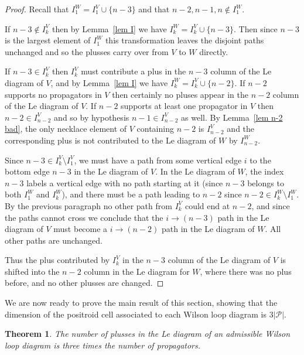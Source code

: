 \documentclass[11pt]{article}
\newcommand{\cP}{\mathcal{P}}
\newtheorem{thm}{Theorem}[section]
\theoremstyle{remark}
\theoremstyle{definition}
\begin{document}
\begin{proof}
Recall that $I_1^W = I_1^V\cup \{n-3\}$ and that $n-2,n-1,n \not\in I_1^W$.

  If $n-3\not\in I_{k}^{V}$ then by Lemma~\ref{lem I} we have $I_{k}^{W} = I_k^{V}\cup \{n-3\}$.  Then since $n-3$ is the largest element of $I_1^{W}$ this transformation leaves the disjoint paths unchanged and so the plusses carry over from $V$ to $W$ directly.

  If $n-3\in I_{k}^{V}$ then $I_k^V$ must contribute a plus in the $n-3$ column of the Le diagram of $V$, and by Lemma~\ref{lem I} we have $I_{k}^{W} = I_k^{V}\cup \{n-2\}$. If $n-2$ supports no propagators in $V$ then certainly no pluses appear in the $n-2$ column of the Le diagram of $V$. If $n-2$ supports at least one propagator in $V$ then $n-2 \in I_{n-2}^V$ and so by hypothesis $n-1 \in I_{n-2}^V$ as well. By Lemma~\ref{lem n-2 bad}, the only necklace element of $V$ containing $n-2$ is $I_{n-2}^{V}$ and the corresponding plus is not contributed to the Le diagram of $W$ by $I_{n-2}^{W}$.

  Since $n-3 \in I_k^V \setminus I_1^V$, we must have a path from some vertical edge $i$ to the bottom edge $n-3$ in the Le diagram of $V$.  In the Le diagram of $W$, the index $n-3$ labels a vertical edge with no path starting at it (since $n-3$ belongs to both $I_1^W$ and $I_k^W$), and there must be a path leading to $n-2$ since $n-2 \in I_k^W \setminus I_1^W$.  By the previous paragraph no other path from $I_k^V$ could end at $n-2$, and since the paths cannot cross we conclude that the $i\rightarrow (n-3)$ path in the Le diagram of $V$ must become a $i\rightarrow (n-2)$ path in the Le diagram of $W$. All other paths are unchanged.

   Thus the plus contributed by $I_k^V$ in the $n-3$ column of the Le diagram of $V$ is shifted into the $n-2$ column in the Le diagram for $W$, where there was no plus before, and no other plusses are changed.
\end{proof}

We are now ready to prove the main result of this section, showing that the dimension of the positroid cell associated to each Wilson loop diagram is $3|\cP|$. 

\begin{thm}\label{thm dim}
  The number of plusses in the Le diagram of an admissible Wilson loop diagram is three times the number of propagators.
\end{thm}
\end{document}
